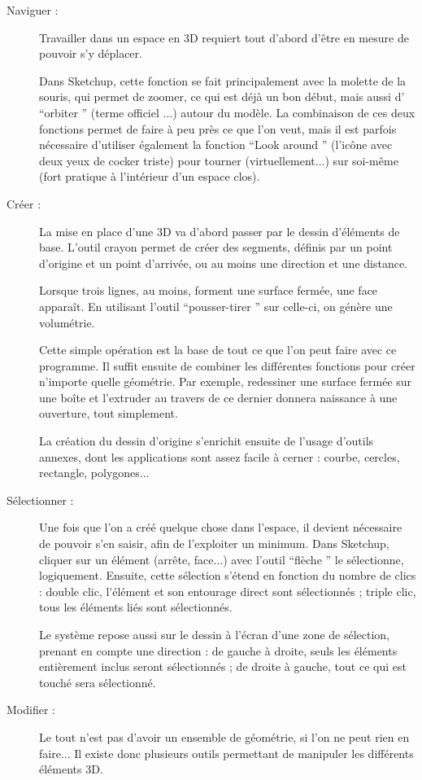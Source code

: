 \documentclass[a4paper,12pt,french]{sphinxmanual}
\begin{document}
\begin{description}
\item[{Naviguer :}] \leavevmode
Travailler dans un espace en 3D requiert tout d'abord d'être en mesure de pouvoir s'y déplacer.

Dans Sketchup, cette fonction se fait principalement avec la molette de la souris, qui permet de zoomer, ce qui est déjà un bon début, mais aussi d' ``orbiter '' (terme officiel ...) autour du modèle. La combinaison de ces deux fonctions permet de faire à peu près ce que l'on veut, mais il est parfois nécessaire d'utiliser également la fonction ``Look around '' (l'icône avec deux yeux de cocker triste) pour tourner (virtuellement...) sur soi-même (fort pratique à l'intérieur d'un espace clos).

\item[{Créer :}] \leavevmode
La mise en place d'une 3D va d'abord passer par le dessin d'éléments de base. L'outil crayon permet de créer des segments, définis par un point d'origine et un point d'arrivée, ou au moins une direction et une distance.

Lorsque trois lignes, au moins, forment une surface fermée, une face apparaît. En utilisant l'outil ``pousser-tirer '' sur celle-ci, on génère une volumétrie.

Cette simple opération est la base de tout ce que l'on peut faire avec ce programme. Il suffit ensuite de combiner les différentes fonctions pour créer n'importe quelle géométrie. Par exemple, redessiner une surface fermée sur une boîte et l'extruder au travers de ce dernier donnera naissance à une ouverture, tout simplement.

La création du dessin d'origine s'enrichit ensuite de l'usage d'outils annexes, dont les applications sont assez facile à cerner : courbe, cercles, rectangle, polygones...

\item[{Sélectionner :}] \leavevmode
Une fois que l'on a créé quelque chose dans l'espace, il devient nécessaire de pouvoir s'en saisir, afin de l'exploiter un minimum. Dans Sketchup, cliquer sur un élément (arrête, face...) avec l'outil ``flèche '' le sélectionne, logiquement. Ensuite, cette sélection s'étend en fonction du nombre de clics : double clic, l'élément et son entourage direct sont sélectionnés ; triple clic, tous les éléments liés sont sélectionnés.

Le système repose aussi sur le dessin à l'écran d'une zone de sélection, prenant en compte une direction : de gauche à droite, seuls les éléments entièrement inclus seront sélectionnés ; de droite à gauche, tout ce qui est touché sera sélectionné.

\item[{Modifier :}] \leavevmode
Le tout n'est pas d'avoir un ensemble de géométrie, si l'on ne peut rien en faire... Il existe donc plusieurs outils permettant de manipuler les différents éléments 3D.

\end{description}
\end{document}
